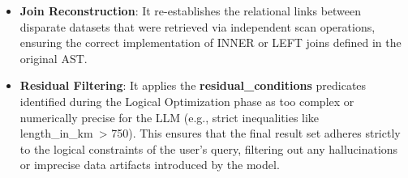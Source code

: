  \begin{itemize}
    \item \textbf{Join Reconstruction}: It re-establishes the relational links between disparate datasets that were retrieved via independent scan operations, ensuring the correct implementation of INNER or LEFT joins defined in the original AST.
    \item \textbf{Residual Filtering}: It applies the \textbf{residual\_conditions} predicates identified during the Logical Optimization phase as too complex or numerically precise for the LLM (e.g., strict inequalities like length\_in\_km\ > 750). This ensures that the final result set adheres strictly to the logical constraints of the user's query, filtering out any hallucinations or imprecise data artifacts introduced by the model.
 \end{itemize}